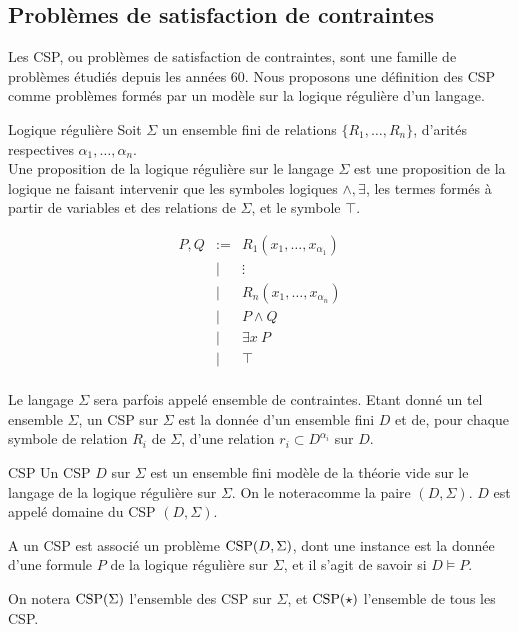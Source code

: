\subsection{Problèmes de satisfaction de contraintes}

Les CSP, ou problèmes de satisfaction de contraintes, sont une famille de
problèmes étudiés depuis les années 60. Nous proposons une définition des CSP
comme problèmes formés par un modèle sur la logique régulière d'un langage.


\begin{defi}{Logique régulière}
    Soit $\Sigma$ un ensemble fini de relations $\{R_1,\dots,R_n\}$, d'arités
    respectives $\alpha_1,\dots,\alpha_n$.\\ Une proposition de la logique
    régulière sur le langage $\Sigma$ est une proposition de la logique ne
    faisant intervenir que les symboles logiques $\wedge, \exists$, les termes
    formés à partir de variables et des relations de $\Sigma$, et le symbole
    $\top$.

    \[\begin{array}{rcl}
    P,Q & := & R_1(x_1, \dots, x_{\alpha_1}) \\
    & |  & \vdots                        \\
    & |  & R_n(x_1, \dots, x_{\alpha_n}) \\
    & |  & P \wedge Q                    \\
    & |  & \exists x \ P                  \\
    & |  & \top                          \\
    \end{array}\]
\end{defi}

Le langage $\Sigma$ sera parfois appelé ensemble de contraintes. Etant donné un
tel ensemble $\Sigma$, un CSP sur $\Sigma$ est la donnée d'un ensemble fini $D$
et de, pour chaque symbole de relation $R_i$ de $\Sigma$, d'une relation $r_i
\subset D^{\alpha_i}$ sur $D$. 


\begin{defi}{CSP}
    Un CSP $D$ sur $\Sigma$ est un ensemble fini modèle de la théorie vide sur le
    langage de la logique régulière sur $\Sigma$. On le noteracomme la paire
    $(D,\Sigma)$. $D$ est appelé domaine du CSP $(D,\Sigma)$.
    
    A un CSP est associé un problème $\text{CSP} (D,\Sigma)$, dont une instance est la
    donnée d'une formule $P$ de la logique régulière sur $\Sigma$, et il s'agit de
    savoir si $D \models P$.
    
    On notera $\text{CSP} (\Sigma)$ l'ensemble des CSP sur $\Sigma$, et $\text{CSP} (\star)$
    l'ensemble de tous les CSP.
\end{defi}

